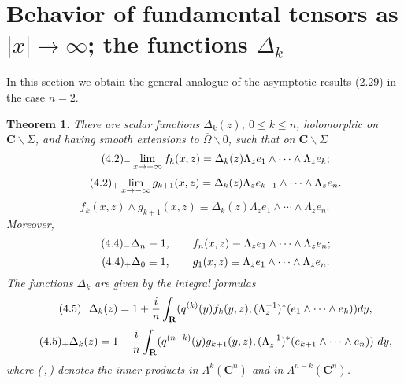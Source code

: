 \documentclass{surv-l}
\theoremstyle{plain}
\newtheorem{theorem}{Theorem}[section]
\theoremstyle{definition}
\numberwithin{equation}{chapter}
\begin{document}
\section{Behavior of fundamental tensors as $|x|\rightarrow\infty$; the functions $\Delta_{k}$}\label{sec4} In this section we obtain the general analogue of the asymptotic results (2.29) in the case $n=2$.
\setcounter{theorem}{0}
\begin{theorem}\label{thm4.1}
There are scalar functions $\Delta_{k}(z),\ 0\leq k\leq n$, holomorphic on $ \mathbf{C}\backslash \Sigma$, and having smooth extensions to $\overline{\Omega}\backslash 0$, such that on $ \mathbf{C}\backslash \Sigma$
\begin{equation*}
\tag*{$(4.2)_{-}$} \displaystyle \lim_{x\rightarrow+\infty}  f_{k}(x,z)=\Delta_{k}(z)\Lambda_{z}e_{1}\wedge\cdots \wedge\Lambda_{z}e_{k};
\end{equation*}
\begin{equation*}
\tag*{$(4.2)_{+}$} \displaystyle \lim_{x\rightarrow-\infty}  g_{k+1}(x, z)=\Delta_{k}(z)\Lambda_{z}e_{k+1}\wedge\cdots \wedge\Lambda_{z}e_{n}.
\end{equation*}
\renewcommand\theequation{\thesection.\arabic{equation}}
\setcounter{equation}{2}
\begin{equation}\label{eq4.3}
f_{k}(x,z)\wedge g_{k+1}(x,z)\equiv\Delta_{k}(z)\Lambda_{z}e_{1}\wedge\cdots \wedge\Lambda_{z}e_{n}.
\end{equation}
Moreover,
\begin{equation*}
\tag*{$(4.4)_{-}$} \Delta_{n}\equiv 1,\qquad  f_{n}(x, z)\equiv\Lambda_{z}e_{1}\wedge\cdots \wedge\Lambda_{z}e_{n};
\end{equation*}
\begin{equation*}
\tag*{$(4.4)_{+}$} \Delta_{0}\equiv 1,\qquad  g_{1}(x,z)\equiv\Lambda_{z}e_{1}\wedge\cdots \wedge\Lambda_{z}e_{n}.
\end{equation*}
The functions $\Delta_{k}$ are given by the integral formulas
\begin{equation*}
\tag*{$(4.5)_{-}$} \Delta_{k}(z) =1+\displaystyle \frac{i}{n}\int_{\mathbf{R}}(q^{(k)}(y)f_{k}(y, z), (\Lambda_{z}^{-1})^{*}(e_{1}\wedge\cdots \wedge e_{k})) dy,
\end{equation*}
\begin{equation*}
\tag*{$(4.5)_{+}$} \Delta_{k}(z)=1-\frac{i}{n}\int_{\mathbf{R}}(q^{(n-k)}(y)g_{k+1}(y, z), (\Lambda_{z}^{-1})^{*}(e_{k+1}\wedge\cdots \wedge e_{n}))\ dy,
\end{equation*}
where \emph{(\,,\,)} denotes the inner products in $\Lambda^{k}(\mathbf{C}^{n})$ and in $\Lambda^{n-k}(\mathbf{C}^{n})$.
\end{theorem}
\end{document}

